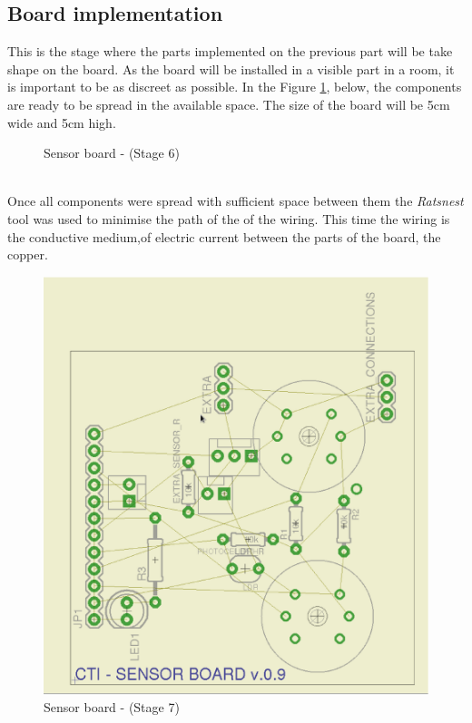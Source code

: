 \documentclass[12pt,a4paper]{report}
\begin{document}
\subsection{Board implementation}
This is the stage where the parts implemented on the previous part will be take shape on the board. As the board will be installed in a visible part in a room, it is important to be as discreet as possible. In the Figure \ref{Sensor-brd-s6}, below, the components are ready to be spread in the available space. The size of the board will be 5cm wide and 5cm high.
\ \\
\begin{figure}[H]
\centering
\caption{Sensor board -  (Stage 6)}
\label{Sensor-brd-s6}
\end{figure}
\ \\
Once all components were spread with sufficient space between them the \textit{Ratsnest} tool was used to minimise the path of the of the wiring. This time the wiring is the conductive medium,of electric current between the parts of the board, the copper.
\ \\
\begin{figure}[H]
\centering
\includegraphics*[scale=0.25]{sens_brd_s7}
\caption{Sensor board -  (Stage 7)}
\label{Sensor-brd-s7}
\end{figure}
\end{document}
